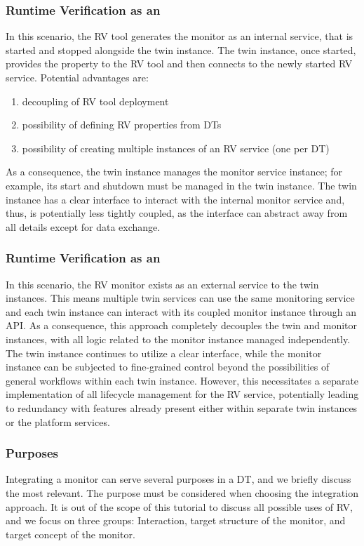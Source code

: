 \subsubsection{Runtime Verification as an \methodtwo}
In this scenario, the RV tool generates the monitor as an internal service, that is started and stopped alongside the twin instance.
The twin instance, once started, provides the property to the RV tool and then connects to the newly started RV service. Potential advantages are:
\begin{enumerate}
	\item decoupling of RV tool deployment
	\item possibility of defining RV properties from DTs
	\item possibility of creating multiple instances of an RV service (one per DT)
\end{enumerate}%
%
As a consequence, the twin instance manages the monitor service instance; for example, its start and shutdown must be managed in the twin instance.
The twin instance has a clear interface to interact with the internal monitor service and, thus, is potentially less tightly coupled,
as the interface can abstract away from all details except for data exchange.

\subsubsection{Runtime Verification as an \methodthree}
In this scenario, the RV monitor exists as an external service to the twin instances. This means multiple twin services can use the same monitoring service and each twin instance can interact with its coupled monitor instance through an API.
As a consequence, this approach completely decouples the twin and monitor instances, with all logic related to the monitor instance managed independently.
The twin instance continues to utilize a clear interface, while the monitor instance can be subjected to fine-grained control beyond the possibilities of general workflows within each twin instance.
However, this necessitates a separate implementation of all lifecycle management for the RV service, potentially leading to redundancy with features already present either within separate twin instances or the platform services.

\subsubsection{Purposes}
Integrating a monitor can serve several purposes in a DT, and we briefly discuss the most relevant. The purpose must be considered when choosing the integration approach.
It is out of the scope of this tutorial to discuss all possible uses of RV, and we focus on three groups: Interaction, target structure of the monitor, and target concept of the monitor.

